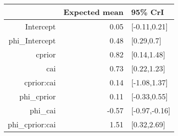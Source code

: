 \begin{tabular}{rrl}
  \hline
 & Expected mean & 95\% CrI \\ 
  \hline
Intercept & 0.05 & [-0.11,0.21] \\ 
  phi\_Intercept & 0.48 & [0.29,0.7] \\ 
  cprior & 0.82 & [0.14,1.48] \\ 
  cai & 0.73 & [0.22,1.23] \\ 
  cprior:cai & 0.14 & [-1.08,1.37] \\ 
  phi\_cprior & 0.11 & [-0.33,0.55] \\ 
  phi\_cai & -0.57 & [-0.97,-0.16] \\ 
  phi\_cprior:cai & 1.51 & [0.32,2.69] \\ 
   \hline
\end{tabular}


